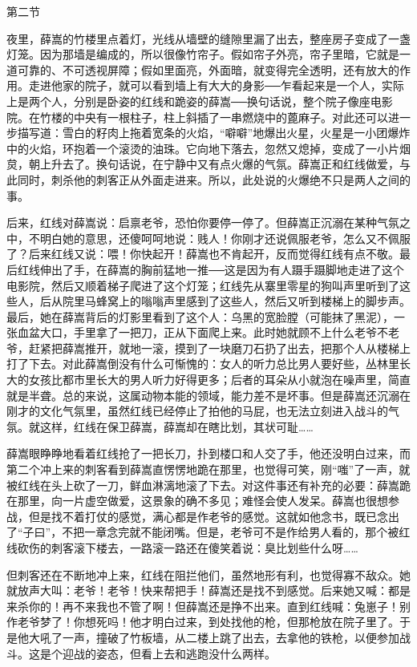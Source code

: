 第二节 

夜里，薛嵩的竹楼里点着灯，光线从墙壁的缝隙里漏了出去，整座房子变成了一盏灯笼。因为那墙是编成的，所以很像竹帘子。假如帘子外亮，帘子里暗，它就是一道可靠的、不可透视屏障；假如里面亮，外面暗，就变得完全透明，还有放大的作用。走进他家的院子，就可以看到墙上有大大的身影──乍看起来是一个人，实际上是两个人，分别是卧姿的红线和跪姿的薛嵩──换句话说，整个院子像座电影院。在竹楼的中央有一根柱子，柱上斜插了一串燃烧中的蓖麻子。对此还可以进一步描写道：雪白的籽肉上拖着宽条的火焰，“噼噼”地爆出火星，火星是一小团爆炸中的火焰，环抱着一个滚烫的油珠。它向地下落去，忽然又熄掉，变成了一小片烟炱，朝上升去了。换句话说，在宁静中又有点火爆的气氛。薛嵩正和红线做爱，与此同时，刺杀他的刺客正从外面走进来。所以，此处说的火爆绝不只是两人之间的事。 

后来，红线对薛嵩说：启禀老爷，恐怕你要停一停了。但薛嵩正沉溺在某种气氛之中，不明白她的意思，还傻呵呵地说：贱人！你刚才还说佩服老爷，怎么又不佩服了？后来红线又说：喂！你快起开！薛嵩也不肯起开，反而觉得红线有点不敬。最后红线伸出了手，在薛嵩的胸前猛地一推──这是因为有人蹑手蹑脚地走进了这个电影院，然后又顺着梯子爬进了这个灯笼；红线先从寨里零星的狗叫声里听到了这些人，后从院里马蜂窝上的嗡嗡声里感到了这些人，然后又听到楼梯上的脚步声。最后，她在薛嵩背后的灯影里看到了这个人：乌黑的宽脸膛（可能抹了黑泥），一张血盆大口，手里拿了一把刀，正从下面爬上来。此时她就顾不上什么老爷不老爷，赶紧把薛嵩推开，就地一滚，摸到了一块磨刀石扔了出去，把那个人从楼梯上打了下去。对此薛嵩倒没有什么可惭愧的：女人的听力总比男人要好些，丛林里长大的女孩比都市里长大的男人听力好得更多；后者的耳朵从小就泡在噪声里，简直就是半聋。总的来说，这属动物本能的领域，能力差不是坏事。但是薛嵩还沉溺在刚才的文化气氛里，虽然红线已经停止了拍他的马屁，也无法立刻进入战斗的气氛。就这样，红线在保卫薛嵩，薛嵩却在瞎比划，其状可耻…… 

薛嵩眼睁睁地看着红线抢了一把长刀，扑到楼口和人交了手，他还没明白过来，而第二个冲上来的刺客看到薛嵩直愣愣地跪在那里，也觉得可笑，刚“嗤”了一声，就被红线在头上砍了一刀，鲜血淋漓地滚了下去。对这件事还有补充的必要：薛嵩跪在那里，向一片虚空做爱，这景象的确不多见；难怪会使人发呆。薛嵩也很想参战，但是找不着打仗的感觉，满心都是作老爷的感觉。这就如他念书，既已念出了“子曰”，不把一章念完就不能闭嘴。但是，老爷可不是作给男人看的，那个被红线砍伤的刺客滚下楼去，一路滚一路还在傻笑着说：臭比划些什么呀…… 

但刺客还在不断地冲上来，红线在阻拦他们，虽然地形有利，也觉得寡不敌众。她就放声大叫：老爷！老爷！快来帮把手！薛嵩还是找不到感觉。后来她又喊：都是来杀你的！再不来我也不管了啊！但薛嵩还是挣不出来。直到红线喊：兔崽子！别作老爷梦了！你想死吗！他才明白过来，到处找他的枪，但那枪放在院子里了。于是他大吼了一声，撞破了竹板墙，从二楼上跳了出去，去拿他的铁枪，以便参加战斗。这是个迎战的姿态，但看上去和逃跑没什么两样。 

